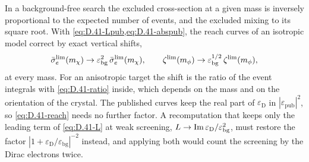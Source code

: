 In a background-free search the excluded cross-section at a given mass is inversely proportional to the expected number of events, and the excluded mixing to its square root. With \cref{eq:D.41-Lpub,eq:D.41-abspub}, the reach curves of an isotropic model correct by exact vertical shifts,
\begin{equation}
  \bar{\sigma}_{e}^{\mathrm{lim}}(m_\chi) \to \varepsilon_{\mathrm{bg}}^2\,\bar{\sigma}_{e}^{\mathrm{lim}}(m_\chi) , \qquad \zeta^{\mathrm{lim}}(m_\phi) \to \varepsilon_{\mathrm{bg}}^{1/2}\,\zeta^{\mathrm{lim}}(m_\phi) ,
  \label{eq:D.41-reach}
\end{equation}
at every mass. For an anisotropic target the shift is the ratio of the event integrals with \cref{eq:D.41-ratio} inside, which depends on the mass and on the orientation of the crystal. The published curves keep the real part of $\varepsilon_{\mathrm{D}}$ in $|\varepsilon_{\mathrm{pub}}|^2$, so \cref{eq:D.41-reach} needs no further factor. A recomputation that keeps only the leading term of \cref{eq:D.41-L} at weak screening, $L \to \operatorname{Im}\varepsilon_{\mathrm{D}}/\varepsilon_{\mathrm{bg}}^2$, must restore the factor $|1 + \varepsilon_{\mathrm{D}}/\varepsilon_{\mathrm{bg}}|^{-2}$ instead, and applying both would count the screening by the Dirac electrons twice.
